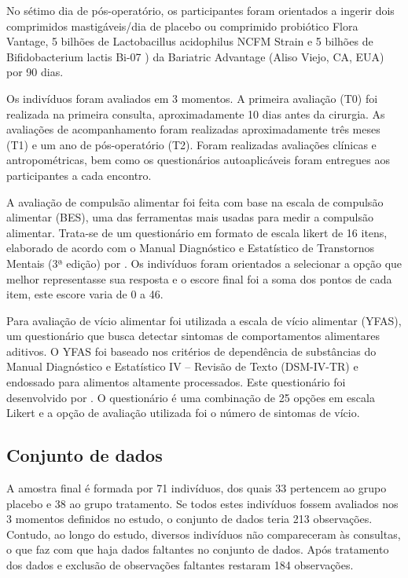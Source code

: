 No sétimo dia de pós-operatório, os participantes foram orientados a ingerir dois comprimidos mastigáveis/dia de placebo ou comprimido probiótico Flora Vantage, 5 bilhões de Lactobacillus acidophilus NCFM \textregistered Strain e 5 bilhões de Bifidobacterium lactis Bi-07 \textregistered) da Bariatric Advantage (Aliso Viejo, CA, EUA) por 90 dias.

Os indivíduos foram avaliados em 3 momentos. A primeira avaliação (T0) foi realizada na primeira consulta, aproximadamente 10 dias antes da cirurgia. As avaliações de acompanhamento foram realizadas aproximadamente três meses (T1) e um ano de pós-operatório (T2). Foram realizadas avaliações clínicas e antropométricas, bem como os questionários autoaplicáveis foram entregues aos participantes a cada encontro.

A avaliação de compulsão alimentar foi feita com base na escala de compulsão alimentar (BES), uma das ferramentas mais usadas para medir a compulsão alimentar. Trata-se de um questionário em formato de escala likert de 16 itens, elaborado de acordo com o Manual Diagnóstico e Estatístico de Transtornos Mentais (3ª edição) \citep{spitzer1980diagnostic} por \citet{gormally1982assessment}. Os indivíduos foram orientados a selecionar a opção que melhor representasse sua resposta e o escore final foi a soma dos pontos de cada item, este escore varia de 0 a 46.

Para avaliação de vício alimentar foi utilizada a escala de vício alimentar (YFAS), um questionário que busca detectar sintomas de comportamentos alimentares aditivos. O YFAS foi baseado nos critérios de dependência de substâncias do Manual Diagnóstico e Estatístico IV – Revisão de Texto (DSM-IV-TR) \citep{segal2010diagnostic} e endossado para alimentos altamente processados. Este questionário foi desenvolvido por \citet{gearhardt2009preliminary}. O questionário é uma combinação de 25 opções em escala Likert e a opção de avaliação utilizada foi o número de sintomas de vício.


\subsection{Conjunto de dados}

A amostra final é formada por 71 indivíduos, dos quais 33 pertencem ao grupo placebo e 38 ao grupo tratamento. Se todos estes indivíduos fossem avaliados nos 3 momentos definidos no estudo, o conjunto de dados teria 213 observações. Contudo, ao longo do estudo, diversos indivíduos não compareceram às consultas, o que faz com que haja dados faltantes no conjunto de dados. Após tratamento dos dados e exclusão de observações faltantes restaram 184 observações.

